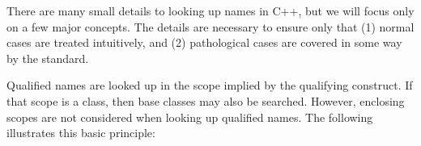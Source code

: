 
There are many small details to looking up names in C++, but we will focus only on a few major concepts. The details are necessary to ensure only that (1) normal cases are treated intuitively, and (2) pathological cases are covered in some way by the standard.

Qualified names are looked up in the scope implied by the qualifying construct. If that scope is a class, then base classes may also be searched. However, enclosing scopes are not considered when looking up qualified names. The following illustrates this basic principle:




